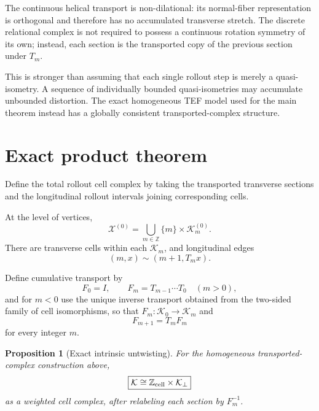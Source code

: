 \documentclass[11pt]{article}
\newtheorem{proposition}{Proposition}
\newcommand{\Z}{\mathbb{Z}}
\newcommand{\cX}{\mathcal{X}}
\newcommand{\cK}{\mathcal{K}}
\begin{document}
The continuous helical transport is non-dilational: its normal-fiber representation is orthogonal and therefore has no accumulated transverse stretch. The discrete relational complex is not required to possess a continuous rotation symmetry of its own; instead, each section is the transported copy of the previous section under \(T_m\).

This is stronger than assuming that each single rollout step is merely a quasi-isometry. A sequence of individually bounded quasi-isometries may accumulate unbounded distortion. The exact homogeneous TEF model used for the main theorem instead has a globally consistent transported-complex structure.

\section{Exact product theorem}

Define the total rollout cell complex by taking the transported transverse sections and the longitudinal rollout intervals joining corresponding cells.

At the level of vertices,
\begin{equation}
\cX^{(0)}
=
\bigcup_{m\in\Z}
\{m\}\times \cK_m^{(0)}.
\end{equation}
There are transverse cells within each \(\cK_m\), and longitudinal edges
\begin{equation}
(m,x)\sim (m+1,T_mx).
\end{equation}

Define cumulative transport by
\begin{equation}
F_0=I,
\qquad
F_m=T_{m-1}\cdots T_0
\quad (m>0),
\end{equation}
and for \(m<0\) use the unique inverse transport obtained from the two-sided family of cell isomorphisms, so that \(F_m:\cK_0\to\cK_m\) and
\begin{equation}
F_{m+1}=T_mF_m
\end{equation}
for every integer \(m\).

\begin{proposition}[Exact intrinsic untwisting]
For the homogeneous transported-complex construction above,
\begin{equation}
\boxed{
\cK
\cong
\Z_{\rm cell}\times \cK_\perp
}
\label{eq:product}
\end{equation}
as a weighted cell complex, after relabeling each section by \(F_m^{-1}\).
\end{proposition}
\end{document}
